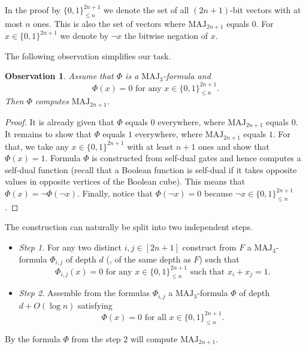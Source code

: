 \documentclass{toc}
\def\MAJ{\mathrm{MAJ}}
\newtheorem{observation}[theorem]{Observation}
\begin{document}
In the proof by $\{0, 1\}^{2n + 1}_{\le n}$ we denote the set of all $(2n + 1)$-bit vectors with at most $n$ ones. This is also the set of vectors where $\MAJ_{2n + 1}$ equals $0$. For $x\in\{0, 1\}^{2n + 1}$ we denote by $\lnot x$ the %
bitwise   %
negation of $x$.

The following observation simplifies our task.
\begin{observation}
\label{simple_obs}
Assume that $\Phi$ is a $\MAJ_3$-formula and 
\[\Phi(x) = 0 \mbox{ for any } x\in\{0, 1\}^{2n + 1}_{\le n}.\]
Then $\Phi$ computes $\MAJ_{2n + 1}$.
\end{observation}
\begin{proof}
It is already given that $\Phi$ equals $0$ everywhere, where $\MAJ_{2n + 1}$ equals $0$. It remains to show that $\Phi$ equals $1$ everywhere, where $\MAJ_{2n + 1}$ equals $1$. For that, we take any $x\in\{0, 1\}^{2n + 1}$ with at least $n + 1$ ones and show that $\Phi(x) = 1$. Formula $\Phi$ is constructed from self-dual gates and hence computes a self-dual function (recall that a Boolean function is self-dual if it takes opposite values in opposite vertices of the Boolean cube). This means that $\Phi(x) = \lnot \Phi(\lnot x)$. Finally, notice that $\Phi(\lnot x) = 0$ because $\lnot x\in\{0, 1\}^{2n + 1}_{\le n}$.
\end{proof}
%
The construction can naturally be  %
split into two independent steps.

\begin{itemize}
\item \emph{Step 1.} For any two distinct $i, j\in [2n + 1]$ construct from $F$ a $\MAJ_3$-formula $\Phi_{i,j}$ of depth $d$ (\ie, of the same depth as $F$) such that
\[
\Phi_{i,j}(x) = 0 \mbox{ for any } x\in\{0, 1\}^{2n + 1}_{\le n} \mbox{ such that } x_i + x_j = 1.\]
\item \emph{Step 2.} Assemble from the formulas $\Phi_{i,j}$ a $\MAJ_3$-formula $\Phi$ of depth $d + O(\log n)$ satisfying 
\[\Phi(x) = 0 \mbox{ for all } x\in\{0, 1\}^{2n + 1}_{\le n}.\]
\end{itemize}
By  the formula $\Phi$ from the step 2 will compute $\MAJ_{2n + 1}$.

\bigskip
\end{document}
